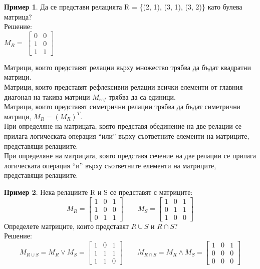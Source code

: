 \documentclass[fleqn, 12pt]{article}
\theoremstyle{definition}
\newtheorem{example}{Пример}[subsection]
\begin{document}
\begin{example}
Да се представи релацията R = \{(2, 1), (3, 1), (3, 2)\} като булева матрица? \\
Решение: \\
$M_R = $
$
\begin{bmatrix}
0 & 0\\
1 & 0\\
1 & 1
\end{bmatrix}
$
\end{example}
Матрици, които представят релации върху множество трябва да бъдат квадратни матрици.\\
Матрици, които представят рефлексивни релации всички елементи от главния диагонал на такива матрици $M_{ref}$ трябва да са единици.\\
Матрици, които представят симетрични релации трябва да бъдат симетрични матрици, $M_R= (M_R)^T$.\\
При определяне на матрицата, която представя обединение на две релации се прилага логическата операция “или” върху съответните елементи на матриците, представящи релациите.\\
При определяне на матрицата, която представя сечение на две релации се прилага логическата операция “и” върху съответните елементи на матриците, представящи релациите. \\
\begin{example}
Нека релациите R и S се представят с матриците:
$$
M_R = 
\begin{bmatrix}
1 & 0 & 1\\
1 & 0 & 0\\
0 & 1 & 1
\end{bmatrix}
\qquad 
M_S = 
\begin{bmatrix}
1 & 0 & 1\\
0 & 1 & 1\\
1 & 0 & 0
\end{bmatrix}
$$
Определете матриците, които представят $R \cup S$ и $R \cap S$? \\
Решение: \\
$$
M_{R \cup S} = M_R \lor M_S = 
\begin{bmatrix}
1 & 0 & 1\\
1 & 1 & 1\\
1 & 1 & 0
\end{bmatrix}
\qquad
M_{R \cap S} = M_R \land M_S =
\begin{bmatrix}
1 & 0 & 1\\
0 & 0 & 0\\
0 & 0 & 0
\end{bmatrix}
$$
\end{example}
\end{document}

